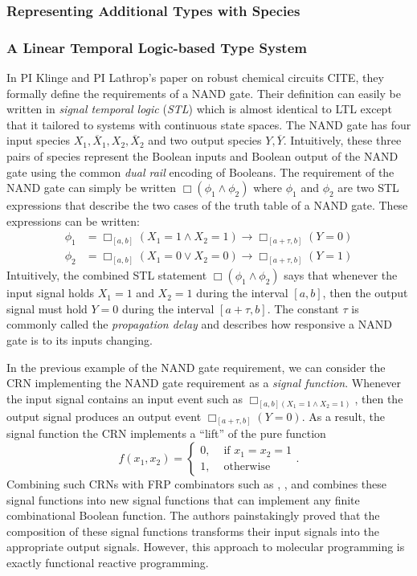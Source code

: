 \subsubsection{Representing Additional Types with Species}

\subsubsection{A Linear Temporal Logic-based Type System}

In PI Klinge and PI Lathrop's paper on robust chemical circuits CITE, they formally define the requirements of a NAND gate.
Their definition can easily be written in \emph{signal temporal logic} (\emph{STL}) which is almost identical to LTL except that it tailored to systems with continuous state spaces.
The NAND gate has four input species \( X_1, \overline{X}_1, X_2, \overline{X}_2  \) and two output species \( Y, \overline{Y} \).
Intuitively, these three pairs of species represent the Boolean inputs and Boolean output of the NAND gate using the common \emph{dual rail} encoding of Booleans.
The requirement of the NAND gate can simply be written \( \Box(\phi_1 \land \phi_2) \) where \( \phi_1 \) and \( \phi_2 \) are two STL expressions that describe the two cases of the truth table of a NAND gate.
These expressions can be written:
\begin{align*}
    \phi_1 &= \Box_{[a,b]} (X_1 = 1 \land X_2 = 1) \rightarrow \Box_{[a+\tau, b]} (Y = 0)\\
    \phi_2 &= \Box_{[a,b]} (X_1 = 0 \lor X_2 = 0)  \rightarrow \Box_{[a+\tau, b]} (Y = 1)
\end{align*}
Intuitively, the combined STL statement \( \Box(\phi_1 \land \phi_2) \) says that whenever the input signal holds \( X_1 = 1 \) and \( X_2 = 1 \) during the interval \( [a,b] \), then the output signal must hold \( Y = 0 \) during the interval \( [a+\tau, b] \).
The constant \( \tau \) is commonly called the \emph{propagation delay} and describes how responsive a NAND gate is to its inputs changing.

In the previous example of the NAND gate requirement, we can consider the CRN implementing the NAND gate requirement as a \emph{signal function}.
Whenever the input signal contains an input event such as \( \Box_{[a,b](X_1 = 1 \land X_2 = 1)} \), then the output signal produces an output event \( \Box_{[a+\tau, b]}(Y = 0) \).
As a result, the signal function the CRN implements a ``lift'' of the pure function
\[
    f(x_1, x_2) =
    \begin{cases}
        0, &\text{ if }x_1 = x_2 = 1\\
        1, &\text{ otherwise}
    \end{cases}.
\]
Combining such CRNs with FRP combinators such as \hask{>>>}, \hask{&&&}, and \hask{***} combines these signal functions into new signal functions that can implement any finite combinational Boolean function.
The authors painstakingly proved that the composition of these signal functions transforms their input signals into the appropriate output signals.
However, this approach to molecular programming is exactly functional reactive programming.

